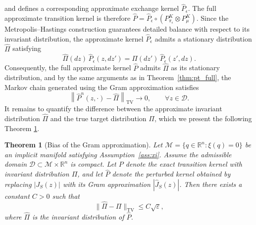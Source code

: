 \documentclass[12pt]{article}
\newtheorem{theorem}{Theorem}[section]
\begin{document}
and defines a corresponding approximate exchange kernel $\widehat{P}_\epsilon$. The full approximate transition kernel is therefore
\(
\widehat{P}
=
\widehat{P}_\epsilon
\circ
(P_{\pi_\epsilon}^K
\otimes
P_\mu^K).
\)
Since the Metropolis--Hastings construction guarantees detailed balance with respect to its invariant distribution, the approximate kernel $\widehat{P}_\epsilon$ admits a stationary distribution $\widehat{\Pi}$ satisfying
\[
\widehat{\Pi}(dz)\,\widehat{P}_\epsilon(z,dz')
=
\widehat{\Pi}(dz')\,\widehat{P}_\epsilon(z',dz).
\]
Consequently, the full approximate kernel $\widehat{P}$ admits $\widehat{\Pi}$ as its stationary distribution, and by the same arguments as in Theorem~\ref{thm:pt_full}, the Markov chain generated using the Gram approximation satisfies
\[
\left\|
\widehat{P}^n(z,\cdot)
-
\widehat{\Pi}
\right\|_{\mathrm{TV}}
\longrightarrow 0,
\qquad
\forall z \in \mathcal D.
\]
It remains to quantify the difference between the approximate invariant distribution $\widehat{\Pi}$ and the true target distribution $\Pi$, which we present the following Theorem \ref{thm:gram_bias}. 

\begin{theorem}[Bias of the Gram approximation]
\label{thm:gram_bias}
Let $\mathcal{M} = \{q \in \mathbb{R}^n : \xi(q) = 0\}$ be an implicit manifold 
satisfying Assumption~\ref{ass:xi}. Assume the admissible domain $\mathcal{D}\subset \mathcal{M}\times \mathbb R^n$ is compact. Let $P$ denote the exact transition kernel with invariant distribution $\Pi$, and let $\widehat{P}$ denote the perturbed kernel obtained by replacing $|J_S(z)|$ with its Gram approximation $|\widehat{J}_S(z)|$. Then there exists a constant $C > 0$ such that
\[
\|\widehat{\Pi} - \Pi\|_{\mathrm{TV}} \le C \sqrt{\varepsilon},
\]
where $\widehat{\Pi}$ is the invariant distribution of $\widehat{P}$.
\end{theorem}
\end{document}
